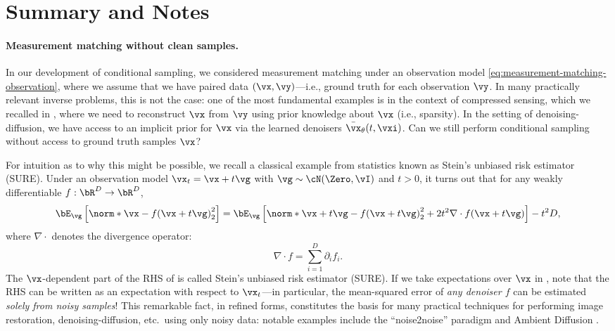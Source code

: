 \documentclass[../../book-main_zh.tex]{subfiles}
\begin{document}
\section{Summary and Notes}
\paragraph{Measurement matching without clean samples.} In our development of
conditional sampling, we considered measurement matching under an observation
model \eqref{eq:measurement-matching-observation}, where we assume that we have
paired data $(\vx, \vy)$—i.e., ground truth for each observation $\vy$.
In many practically relevant inverse problems, this is not the case: one of the
most fundamental examples is in the context of compressed sensing, which we
recalled in , where we need to reconstruct
$\vx$ from $\vy$
using prior knowledge about $\vx$ (i.e., sparsity).
In the setting of denoising-diffusion, we have access to an implicit prior for
$\vx$ via the learned denoisers $\bar{\vx}_{\theta}(t, \vxi)$. Can we
still perform
conditional sampling without access to ground truth samples $\vx$?

For intuition as to why this might be possible, we recall a classical example
from statistics known as Stein's unbiased risk estimator (SURE).
Under an observation model $\vx_t = \vx + t \vg$ with $\vg \sim \cN(\Zero,
\vI)$ and $t>0$, it turns out that for any weakly differentiable $f :
\bR^D \to \bR^D$,
\begin{equation}\label{eq:sure-risk}
    \bE_{\vg}\left[
        \norm*{\vx - f(\vx + t \vg)}_2^2
    \right]
    =
    \bE_{\vg}\left[
        \norm*{\vx+t\vg - f(\vx + t \vg)}_2^2
        + 2t^2 \nabla \cdot f(\vx + t\vg)
    \right]
    - t^2 D,
\end{equation}
where $\nabla \cdot$ denotes the divergence operator:
\begin{equation*}
    \nabla \cdot f = \sum_{i=1}^D \partial_i f_i.
\end{equation*}
The $\vx$-dependent part of the RHS of  is called
Stein's unbiased risk
estimator (SURE). If we take expectations over $\vx$ in ,
note that the RHS can be written as an expectation with respect to $\vx_t$---in
particular, the mean-squared error of \textit{any denoiser $f$} can be estimated
\textit{solely from noisy samples}!
This remarkable fact, in refined forms, constitutes the basis for many practical
techniques for performing image restoration, denoising-diffusion, etc.\ using
only noisy data: notable examples include the ``noise2noise'' paradigm
\cite{pmlr-v80-lehtinen18a}
and Ambient Diffusion \cite{daras2023ambient}.
\end{document}
